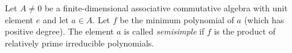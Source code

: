 Let $A \neq 0$ be a finite-dimensional associative commutative algebra with unit element $e$ and let $a \in A$. Let $f$ be the minimum polynomial of $a$ (which has positive degree). The element $a$ is called \textit{semisimple} if $f$ is the product of relatively prime irreducible polynomials.
